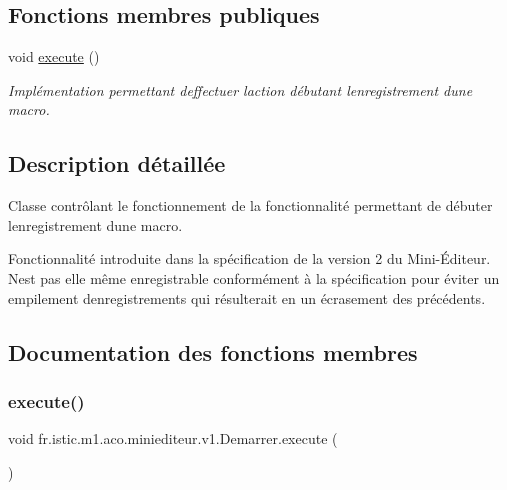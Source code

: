 \subsection*{Fonctions membres publiques}
\begin{DoxyCompactItemize}
\item 
void \hyperlink{classfr_1_1istic_1_1m1_1_1aco_1_1miniediteur_1_1v1_1_1Demarrer_a1de3c107a8ee460c70a5b98e6b7edd69}{execute} ()
\begin{DoxyCompactList}\small\item\em Implémentation permettant d\textquotesingle{}effectuer l\textquotesingle{}action débutant l\textquotesingle{}enregistrement d\textquotesingle{}une macro. \end{DoxyCompactList}\end{DoxyCompactItemize}


\subsection{Description détaillée}
Classe contrôlant le fonctionnement de la fonctionnalité permettant de débuter l\textquotesingle{}enregistrement d\textquotesingle{}une macro. 

Fonctionnalité introduite dans la spécification de la version 2 du Mini-\/Éditeur. N\textquotesingle{}est pas elle même enregistrable conformément à la spécification pour éviter un empilement d\textquotesingle{}enregistrements qui résulterait en un écrasement des précédents. 

\subsection{Documentation des fonctions membres}
\mbox{\label{classfr_1_1istic_1_1m1_1_1aco_1_1miniediteur_1_1v1_1_1Demarrer_a1de3c107a8ee460c70a5b98e6b7edd69}} 
\subsubsection{\texorpdfstring{execute()}{execute()}}
{\footnotesize\ttfamily void fr.\+istic.\+m1.\+aco.\+miniediteur.\+v1.\+Demarrer.\+execute (\begin{DoxyParamCaption}{ }\end{DoxyParamCaption})}



